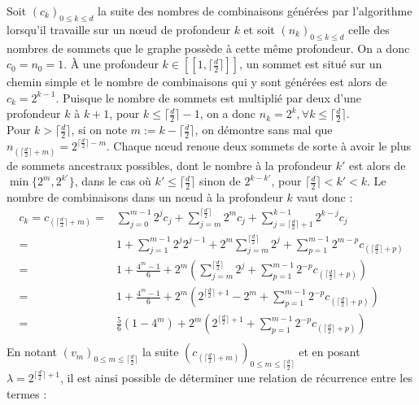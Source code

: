 \documentclass[12pt, twoside]{report}
\begin{document}
Soit $(c_k)_{0\leq k \leq d}$ la suite des nombres de combinaisons générées par l'algorithme lorsqu'il travaille sur un n\oe{}ud de profondeur $k$ et soit $(n_k)_{0\leq k \leq d}$ celle des nombres de sommets que le graphe possède à cette même profondeur. On a donc $c_0 = n_0 = 1$. À une profondeur $k \in [\![1,\lceil \frac{d}{2}\rceil]\!]$, un sommet est situé sur un chemin simple et le nombre de combinaisons qui y sont générées est alors de $c_k = 2^{k-1}$. Puisque le nombre de sommets est multiplié par deux d'une profondeur $k$ à $k+1$, pour $k \leq \lceil \frac{d}{2}\rceil -1$, on a donc $n_k=2^k, \forall k\leq \lceil \frac{d}{2} \rceil$.\\
Pour $k > \lceil \frac{d}{2} \rceil $, si on note $m:=k-\lceil \frac{d}{2} \rceil$, on démontre sans mal que $n_{(\lceil \frac{d}{2} \rceil + m)} = 2^{\lceil \frac{d}{2}\rceil - m}$. Chaque n\oe{}ud renoue deux sommets de sorte à avoir le plus de sommets ancestraux possibles, dont le nombre à la profondeur $k'$ est alors de $\min\{2^{m}, 2^{k'}\}$, dans le cas où $k'\leq \lceil \frac{d}{2} \rceil$ sinon de $2^{k-k'}$, pour $\lceil \frac{d}{2} \rceil < k' <k$.
Le nombre de combinaisons dans un n\oe{}ud à la profondeur $k$ vaut donc :
\begin{equation}
    \begin{split}
        c_k = c_{(\lceil \frac{d}{2} \rceil + m)} = & \sum_{j=0}^{m-1} 2^j c_j + \sum_{j=m}^{\lceil \frac{d}{2} \rceil} 2^m c_j + \sum_{j=\lceil \frac{d}{2} \rceil+1}^{k-1}2^{k-j}c_j \\
        = & 1 + \sum_{j=1}^{m-1} 2^j 2^{j-1} + 2^m\sum_{j=m}^{\lceil \frac{d}{2} \rceil} 2^j + \sum_{p=1}^{m-1} 2^{m-p}c_{(\lceil \frac{d}{2} \rceil + p)}\\
        = & 1 + \frac{4^m - 1}{6} + 2^m\left(\sum_{j=m}^{\lceil \frac{d}{2} \rceil} 2^j + \sum_{p=1}^{m-1} 2^{-p}c_{(\lceil \frac{d}{2} \rceil + p)}\right)\\
        = & 1 + \frac{4^m - 1}{6} + 2^m\left(2^{\lceil \frac{d}{2} \rceil+1} - 2^m + \sum_{p=1}^{m-1} 2^{-p}c_{(\lceil \frac{d}{2} \rceil + p)}\right)\\
        = & \frac{5}{6}(1-4^m) + 2^m\left(2^{\lceil \frac{d}{2} \rceil+1} + \sum_{p=1}^{m-1} 2^{-p}c_{(\lceil \frac{d}{2} \rceil + p)}\right)\\
    \end{split}
\end{equation}
En notant $(v_m)_{0\leq m \leq \lceil \frac{d}{2} \rceil}$ la suite $(c_{(\lceil \frac{d}{2} \rceil+m)})_{0\leq m \leq \lceil \frac{d}{2} \rceil}$ et en posant $\lambda = 2^{\lceil \frac{d}{2} \rceil + 1}$, il est ainsi possible de déterminer une relation de récurrence entre les termes :
\end{document}
